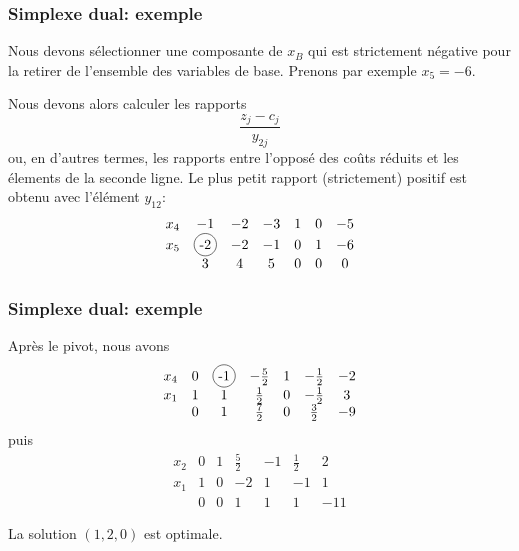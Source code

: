 \documentclass[usepdftitle=false]{beamer}
\newcommand*\circled[1]{\tikz[baseline=(char.base)]{
    \node[shape=circle,draw,inner sep=2pt] (char) {#1};}}
\begin{document}
\begin{frame}
	\frametitle{Simplexe dual: exemple}
	
	Nous devons sélectionner une composante de $x_B$ qui est strictement négative pour la retirer de l'ensemble des variables de base.
	Prenons par exemple $x_5 = -6$.
	
	\mbox{}
	
	Nous devons alors calculer les rapports
	\[
	\frac{z_j - c_j}{y_{2j}}
	\]
	ou, en d'autres termes, les rapports entre l'opposé des coûts réduits et les élements de la seconde ligne.
	Le plus petit rapport (strictement) positif est obtenu avec l'élément $y_{12}$:
	\[
	\begin{matrix}
		x_4 & -1 & -2 & -3 & 1 & 0 & -5 \\
		x_5 & \circled{-2} & -2 & -1 & 0 & 1 & -6 \\
		& 3 & 4 & 5 & 0 & 0 & 0
	\end{matrix}
	\]
	
\end{frame}

\begin{frame}
	\frametitle{Simplexe dual: exemple}
	
	Après le pivot, nous avons
	\[
	\begin{matrix}
		x_4 & 0 & \circled{-1} & -\frac{5}{2} & 1 & -\frac{1}{2} & -2 \\
		x_1 & 1 & 1 & \frac{1}{2} & 0 & -\frac{1}{2} & 3 \\
		& 0 & 1 & \frac{7}{2} & 0 & \frac{3}{2} & -9
	\end{matrix}
	\]
	puis
	\[
	\begin{matrix}
		x_2 & 0 & 1 & \frac{5}{2} & -1 & \frac{1}{2} & 2 \\
		x_1 & 1 & 0 & -2 & 1 & -1 & 1 \\
		& 0 & 0 & 1 & 1 & 1 & -11
	\end{matrix}
	\]
	
	\mbox{}
	
	La solution $(1, 2, 0)$ est optimale.
	
\end{frame}
\end{document}
